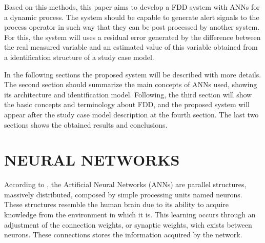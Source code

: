 \documentclass[10pt,fleqn,a4paper]{article}
\begin{document}
Based on this methods, this paper aims to develop a FDD system with ANNs for a
dynamic process. The system should be capable to generate alert signals to the
process operator in such way that they can be post processed by another system.
For this, the system will uses a residual error generated by the difference
between the real measured variable and an estimated value of this variable
obtained from a identification structure of a study case model.

In the following sections the proposed system will be described with more
details. The second section should summarize the main concepts of ANNs used,
showing its architecture and identification model. Following, the third section
will show the basic concepts and terminology about FDD, and the proposed system
will appear after the study case model description at the fourth section. The
last two sections shows the obtained results and conclusions.

\section{NEURAL NETWORKS}\label{sec:ann}

According to \citet{haykin:2000}, the Artificial Neural Networks (ANNs) are
parallel structures, massively distributed, composed by simple processing units
named neurons. These structures resemble the human brain due to its ability to
acquire knowledge from the environment in which it is. This learning occurs
through an adjustment of the connection weights, or synaptic weights, wich
exists between neurons. These connections stores the information acquired by the
network.
\end{document}
